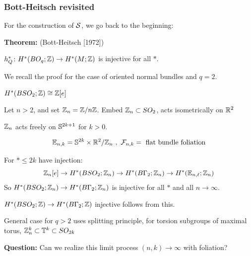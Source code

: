 \documentclass{beamer}
\begin{document}
 
\frame
{
  \frametitle{Bott-Heitsch revisited}

 
  For the construction of ${\mathcal S}$, we go back to the beginning:
  \medskip
  
    {\bf Theorem:} (Bott-Heitsch [1972])  
   \begin{center}
$h_Q^* \colon H^{*}(BO_q ; {\mathbb Z}) \to H^{*}(M ; {\mathbb Z})$ is injective for all $*$.
 \end{center}

 \bigskip
 \pause
We recall the proof for the case of oriented normal bundles and $q =2$. 
\medskip
\pause

 $H^*(BSO_2 ; {\mathbb Z}) \cong {\mathbb Z}[e]$
 
 \medskip
 
 Let $n > 2$, and set ${\mathbb Z}_n = {\mathbb Z}/n {\mathbb Z}$. Embed ${\mathbb Z}_n \subset SO_2$, acts isometrically on ${\mathbb R}^2$
 
 \medskip
 
 ${\mathbb Z}_n$ acts freely on ${\mathbb S}^{2k+1}$ for $k > 0$.
 
  
 
 $${\mathbb E}_{n,k} = {\mathbb S}^{2k} \times {\mathbb R}^2 / {\mathbb Z}_n ~, ~ {\mathcal F}_{n,k} = ~{\rm flat ~ bundle ~ foliation}$$
   \vfill
  
}
  
 \frame
{
  
 
For $* \leq 2k$ have injection:
 $${\mathbb Z}_n[e] \to H^*(BSO_2 ; {\mathbb Z}_n) \to H^*(B\Gamma_2 ; {\mathbb Z}_n) \to H^*({\mathbb E}_{n,\ell} ; {\mathbb Z}_n)$$
 So $H^*(BSO_2 ; {\mathbb Z}_n) \to H^*(B\Gamma_2 ; {\mathbb Z}_n)$ is injective for all $*$ and all $n \to \infty$.
 \medskip
 
 $H^*(BSO_2 ; {\mathbb Z}) \to H^*(B\Gamma_2 ; {\mathbb Z})$   injective follows  from this. 
 
 \medskip
 \pause
 
 General case for $q > 2$ uses splitting principle, for torsion subgroups of maximal torus, ${\mathbb Z}_n^{k} \subset {\mathbb T}^{k} \subset SO_{2k}$
 
 \bigskip
 \pause
 
 {\bf Question:} Can we realize this limit process $(n, k) \to \infty$ with foliation?
  \vfill
  
}
\end{document}
